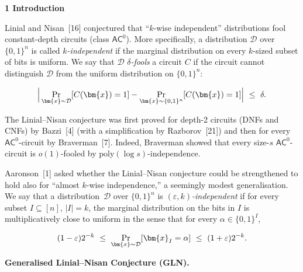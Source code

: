 

\par\medskip\noindent\textbf{
1 Introduction}\par




Linial and Nisan [16] conjectured that “$k$-wise independent” distributions fool constant-depth circuits (class $\textsf{AC}^{0}$). More specifically, a distribution $\mathcal{D}$ over $\{0,1\}^{n}$ is called \emph{$k$-independent} if the marginal distribution on every $k$-sized subset of bits is uniform. We say that $\mathcal{D}$ \emph{$\delta$-fools} a circuit $C$ if the circuit cannot distinguish $\mathcal{D}$ from the uniform distribution on $\{0,1\}^{n}$:\par


\[\begin{gathered}
\Big{|}\Pr_{\bm{x}\sim\mathcal{D}}[C(\bm{x})=1]-\Pr_{\bm{x}\sim\{0,1\}^{n}}[C(\bm{x})=1]\Big{|}\nobreak\ \leq\nobreak\ \delta.
\end{gathered}\]


The Linial–Nisan conjecture was first proved for depth-2 circuits (DNFs and CNFs) by Bazzi [4] (with a simplification by Razborov [21]) and then for every $\textsf{AC}^{0}$-circuit by Braverman [7]. Indeed, Braverman showed that every size-$s$ $\textsf{AC}^{0}$-circuit is $o(1)$-fooled by $\mathrm{poly}(\log s)$-independence.\par




Aaronson [1] asked whether the Linial–Nisan conjecture could be strengthened to hold also for “almost $k$-wise independence,” a seemingly modest generalisation. We say that a distribution $\mathcal{D}$ over $\{0,1\}^{n}$ is \emph{$(\varepsilon,k)$-independent} if for every subset $I\subseteq[n]$, $|I|=k$, the marginal distribution on the bits in $I$ is multiplicatively close to uniform in the sense that for every $\alpha\in\{0,1\}^{I}$,\par


\[\begin{gathered}
(1-\varepsilon)2^{-k}\nobreak\ \leq\nobreak\ \Pr\limits_{\bm{x}\sim\mathcal{D}}[\bm{x}_{I}=\alpha]\nobreak\ \leq\nobreak\ (1+\varepsilon)2^{-k}.
\end{gathered}\]





\par\medskip\noindent\textbf{
\textbf{Generalised Linial–Nisan Conjecture (GLN)}\textbf{.}
}\par



